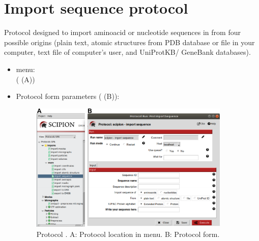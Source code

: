 \section{Import sequence protocol}
\label{app:importSequence}%
Protocol designed to import aminoacid or nucleotide sequences in \scipion from four possible origins (plain text, atomic structures from PDB database or file in your computer, text file of computer's user, and UniProtKB/ GeneBank databases).

\begin{itemize}
  \item \scipion menu:\\
   ( (A))\\
  
  \item Protocol form parameters ( (B)):\\
  
  \begin{figure}[H]
    \centering 
    \captionsetup{width=.7\linewidth} 
    \includegraphics[width=0.90\textwidth]{Images_appendix/Fig104.pdf}
    \caption{Protocol . A: Protocol location in \scipion menu. B: Protocol form.}
    \label{fig:app_protocol_sequence_1}
   \end{figure}
  

\end{itemize}
